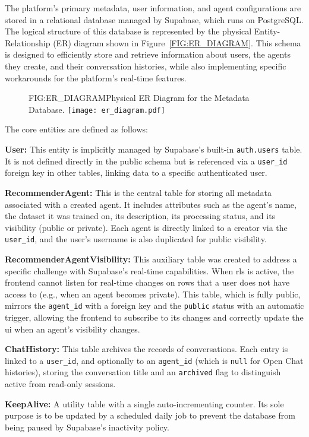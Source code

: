 The platform's primary metadata, user information, and agent configurations are stored in a relational database managed by Supabase, which runs on PostgreSQL. The logical structure of this database is represented by the physical Entity-Relationship (ER) diagram shown in Figure~\ref{FIG:ER_DIAGRAM}. This schema is designed to efficiently store and retrieve information about users, the agents they create, and their conversation histories, while also implementing specific workarounds for the platform's real-time features.

\begin{figure}[Physical ER Diagram]{FIG:ER_DIAGRAM}{Physical ER Diagram for the Metadata Database.}
    \centering
    \texttt{[image: er\_diagram.pdf]}
\end{figure}

The core entities are defined as follows:
\begin{compactitem}[\textbullet]
    \item \textbf{User:} This entity is implicitly managed by Supabase's built-in \texttt{auth.users} table. It is not defined directly in the public schema but is referenced via a \texttt{user\_id} foreign key in other tables, linking data to a specific authenticated user.
    \item \textbf{RecommenderAgent:} This is the central table for storing all metadata associated with a created agent. It includes attributes such as the agent's name, the dataset it was trained on, its description, its processing status, and its visibility (public or private). Each agent is directly linked to a creator via the \texttt{user\_id}, and the user's username is also duplicated for public visibility.
    \item \textbf{RecommenderAgentVisibility:} This auxiliary table was created to address a specific challenge with Supabase's real-time capabilities. When \acl{rls} is active, the frontend cannot listen for real-time changes on rows that a user does not have access to (e.g., when an agent becomes private). This table, which is fully public, mirrors the \texttt{agent\_id} with a foreign key and the \texttt{public} status with an automatic trigger, allowing the frontend to subscribe to its changes and correctly update the \acs{ui} when an agent's visibility changes.
    \item \textbf{ChatHistory:} This table archives the records of conversations. Each entry is linked to a \texttt{user\_id}, and optionally to an \texttt{agent\_id} (which is \texttt{null} for Open Chat histories), storing the conversation title and an \texttt{archived} flag to distinguish active from read-only sessions.
    \item \textbf{KeepAlive:} A utility table with a single auto-incrementing counter. Its sole purpose is to be updated by a scheduled daily job to prevent the database from being paused by Supabase's inactivity policy.
\end{compactitem}